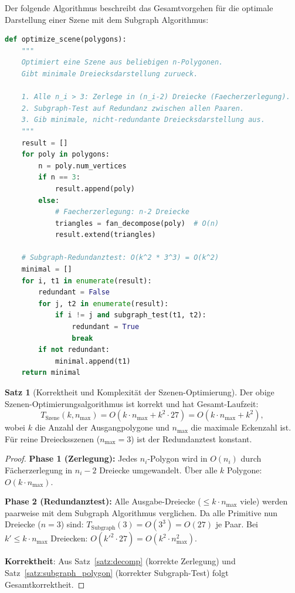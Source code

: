 ﻿\documentclass[a4paper,12pt]{article}
\theoremstyle{definition}
\newtheorem{satz}{Satz}[section]
\begin{document}
Der folgende Algorithmus beschreibt das Gesamtvorgehen f\"ur die optimale
Darstellung einer Szene mit dem Subgraph Algorithmus:

\begin{lstlisting}[language=Python, caption=Subgraph-basierte Szenen-Optimierung]
def optimize_scene(polygons):
    """
    Optimiert eine Szene aus beliebigen n-Polygonen.
    Gibt minimale Dreiecksdarstellung zurueck.

    1. Alle n_i > 3: Zerlege in (n_i-2) Dreiecke (Faecherzerlegung).
    2. Subgraph-Test auf Redundanz zwischen allen Paaren.
    3. Gib minimale, nicht-redundante Dreiecksdarstellung aus.
    """
    result = []
    for poly in polygons:
        n = poly.num_vertices
        if n == 3:
            result.append(poly)
        else:
            # Faecherzerlegung: n-2 Dreiecke
            triangles = fan_decompose(poly)  # O(n)
            result.extend(triangles)

    # Subgraph-Redundanztest: O(k^2 * 3^3) = O(k^2)
    minimal = []
    for i, t1 in enumerate(result):
        redundant = False
        for j, t2 in enumerate(result):
            if i != j and subgraph_test(t1, t2):
                redundant = True
                break
        if not redundant:
            minimal.append(t1)
    return minimal
\end{lstlisting}

\begin{satz}[Korrektheit und Komplexit\"at der Szenen-Optimierung]
\label{satz:scene_opt}
Der obige Szenen-Optimierungsalgorithmus ist korrekt und hat
Gesamt-Laufzeit:
\[
	T_{\text{Szene}}(k, n_{\max}) = O\!\left(k \cdot n_{\max} +
	k^2 \cdot 27\right) = O\!\left(k \cdot n_{\max} + k^2\right),
\]
wobei $k$ die Anzahl der Ausgangpolygone und $n_{\max}$ die maximale
Eckenzahl ist. F\"ur reine Dreiecksszenen ($n_{\max} = 3$) ist der
Redundanztest konstant.
\end{satz}

\begin{proof}
\textbf{Phase 1 (Zerlegung):} Jedes $n_i$-Polygon wird in $O(n_i)$ durch
F\"acherzerlegung in $n_i - 2$ Dreiecke umgewandelt. \"Uber alle $k$
Polygone: $O(k \cdot n_{\max})$.

\textbf{Phase 2 (Redundanztest):} Alle Ausgabe-Dreiecke ($\leq k \cdot n_{\max}$
viele) werden paarweise mit dem Subgraph Algorithmus verglichen.
Da alle Primitive nun Dreiecke ($n = 3$) sind:
$T_{\text{Subgraph}}(3) = O(3^3) = O(27)$ je Paar.
Bei $k' \leq k \cdot n_{\max}$ Dreiecken: $O(k'^2 \cdot 27) = O(k^2 \cdot n_{\max}^2)$.

\textbf{Korrektheit}: Aus Satz~\ref{satz:decomp} (korrekte Zerlegung) und
Satz~\ref{satz:subgraph_polygon} (korrekter Subgraph-Test) folgt
Gesamtkorrektheit.
\end{proof}
\end{document}
